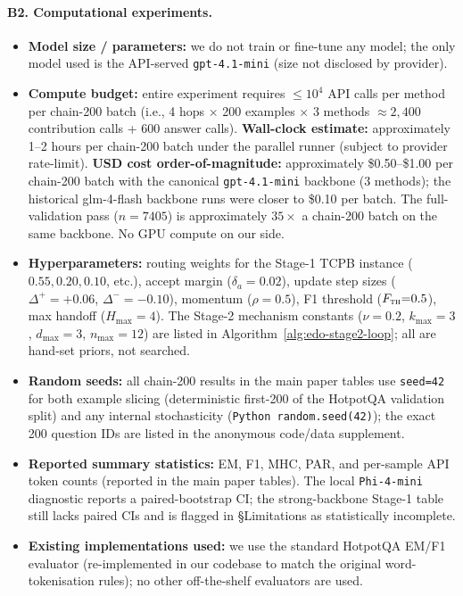 \paragraph{B2. Computational experiments.}
\begin{itemize}\setlength\itemsep{1pt}
\item \textbf{Model size / parameters:} we do not train or fine-tune any model; the only model used is the API-served \texttt{gpt-4.1-mini} (size not disclosed by provider).
\item \textbf{Compute budget:} entire experiment requires $\le 10^4$ API calls per method per chain-200 batch (i.e., 4 hops $\times$ 200 examples $\times$ 3 methods $\approx 2{,}400$ contribution calls + 600 answer calls). \textbf{Wall-clock estimate:} approximately 1--2 hours per chain-200 batch under the parallel runner (subject to provider rate-limit). \textbf{USD cost order-of-magnitude:} approximately \$0.50--\$1.00 per chain-200 batch with the canonical \texttt{gpt-4.1-mini} backbone (3 methods); the historical glm-4-flash backbone runs were closer to \$0.10 per batch. The full-validation pass ($n{=}7405$) is approximately $35{\times}$ a chain-200 batch on the same backbone. No GPU compute on our side.
\item \textbf{Hyperparameters:} routing weights for the Stage-1 TCPB instance ($0.55, 0.20, 0.10$, etc.), accept margin ($\delta_a{=}0.02$), update step sizes ($\Delta^{+}{=}{+}0.06$, $\Delta^{-}{=}{-}0.10$), momentum ($\rho{=}0.5$), F1 threshold ($F_\textsc{th}{=}0.5$), max handoff ($H_{\max}{=}4$). The Stage-2 mechanism constants ($\nu{=}0.2$, $k_{\max}{=}3$, $d_{\max}{=}3$, $n_{\max}{=}12$) are listed in Algorithm~\ref{alg:edo-stage2-loop}; all are hand-set priors, not searched.
\item \textbf{Random seeds:} all chain-200 results in the main paper tables use \texttt{seed=42} for both example slicing (deterministic first-200 of the HotpotQA validation split) and any internal stochasticity (\texttt{Python random.seed(42)}); the exact 200 question IDs are listed in the anonymous code/data supplement.
\item \textbf{Reported summary statistics:} EM, F1, MHC, PAR, and per-sample API token counts (reported in the main paper tables). The local \texttt{Phi-4-mini} diagnostic reports a paired-bootstrap CI; the strong-backbone Stage-1 table still lacks paired CIs and is flagged in \S Limitations as statistically incomplete.
\item \textbf{Existing implementations used:} we use the standard HotpotQA EM/F1 evaluator (re-implemented in our codebase to match the original word-tokenisation rules); no other off-the-shelf evaluators are used.
\end{itemize}

